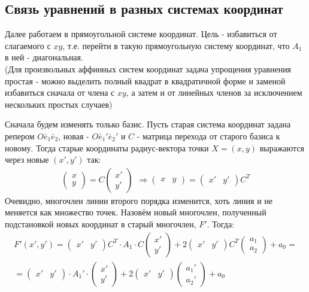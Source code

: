 \documentclass[a4paper, 12pt]{article}
\theoremstyle{definition}
\begin{document}
	\subsection{Связь уравнений в разных системах координат}
	Далее работаем в прямоугольной системе координат. Цель - избавиться от слагаемого с $xy$, т.е. перейти в такую прямоугольную систему координат, что $A_1$ в ней - диагональная.\\
	(Для произвольных аффинных систем координат задача упрощения уравнения простая - можно выделить полный квадрат в квадратичной форме и заменой избавиться сначала от члена с $xy$, а затем и от линейных членов за исключением нескольких простых случаев)

	Сначала будем изменять только базис. Пусть старая система координат задана репером $O\bar{e}_{1}\bar{e}_{2}$, новая - $O\bar{e}_{1}'\bar{e}_{2}'$ и $C$ - матрица перехода от старого базиса к новому. Тогда старые координаты радиус-вектора точки $X = (x, y)$ выражаются через новые $(x', y')$ так:\begin{align*}\begin{pmatrix} x \\ y \end{pmatrix} = C\begin{pmatrix} x'\\ y' \end{pmatrix} \ \ \Rightarrow \begin{pmatrix} x&y \end{pmatrix} = \begin{pmatrix} x'&y' \end{pmatrix}C^T\end{align*}
	Очевидно, многочлен линии второго порядка изменится, хоть линия и не меняется как множество точек. Назовём новый многочлен, полученный подстановкой новых координат в старый многочлен, $F'$. Тогда:
	\begin{align*}
		F'(x', y') = \begin{pmatrix} x'&y' \end{pmatrix}C^T \cdot A_1 \cdot C\begin{pmatrix} x'\\ y' \end{pmatrix} + 2\begin{pmatrix} x'&y' \end{pmatrix}C^T\begin{pmatrix}a_1\\a_2\end{pmatrix} + a_0 = \\ = \begin{pmatrix} x'&y' \end{pmatrix}\cdot A_1' \cdot\begin{pmatrix} x'\\ y' \end{pmatrix} + 2\begin{pmatrix} x'&y' \end{pmatrix}\begin{pmatrix}a_1'\\a_2'\end{pmatrix} + a_0 \ \ \ \ \ \ \ \ \ \ \ \ \,
	\end{align*}
\end{document}
